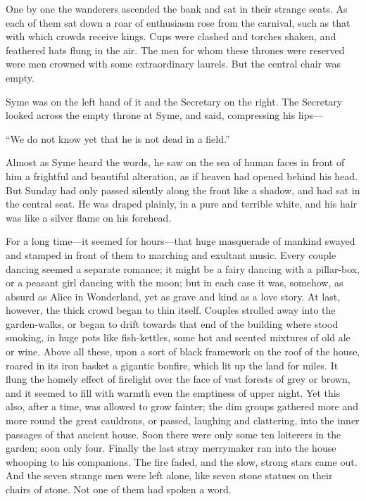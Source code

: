 One by one the wanderers ascended the bank and sat in their strange seats. As each of them sat down a roar of enthusiasm rose from the carnival, such as that with which crowds receive kings. Cups were clashed and torches shaken, and feathered hats flung in the air. The men for whom these thrones were reserved were men crowned with some extraordinary laurels. But the central chair was empty.

Syme was on the left hand of it and the Secretary on the right. The Secretary looked across the empty throne at Syme, and said, compressing his lips⁠—

“We do not know yet that he is not dead in a field.”

Almost as Syme heard the words, he saw on the sea of human faces in front of him a frightful and beautiful alteration, as if heaven had opened behind his head. But Sunday had only passed silently along the front like a shadow, and had sat in the central seat. He was draped plainly, in a pure and terrible white, and his hair was like a silver flame on his forehead.

For a long time⁠—it seemed for hours⁠—that huge masquerade of mankind swayed and stamped in front of them to marching and exultant music. Every couple dancing seemed a separate romance; it might be a fairy dancing with a pillar-box, or a peasant girl dancing with the moon; but in each case it was, somehow, as absurd as Alice in Wonderland, yet as grave and kind as a love story. At last, however, the thick crowd began to thin itself. Couples strolled away into the garden-walks, or began to drift towards that end of the building where stood smoking, in huge pots like fish-kettles, some hot and scented mixtures of old ale or wine. Above all these, upon a sort of black framework on the roof of the house, roared in its iron basket a gigantic bonfire, which lit up the land for miles. It flung the homely effect of firelight over the face of vast forests of grey or brown, and it seemed to fill with warmth even the emptiness of upper night. Yet this also, after a time, was allowed to grow fainter; the dim groups gathered more and more round the great cauldrons, or passed, laughing and clattering, into the inner passages of that ancient house. Soon there were only some ten loiterers in the garden; soon only four. Finally the last stray merrymaker ran into the house whooping to his companions. The fire faded, and the slow, strong stars came out. And the seven strange men were left alone, like seven stone statues on their chairs of stone. Not one of them had spoken a word.

